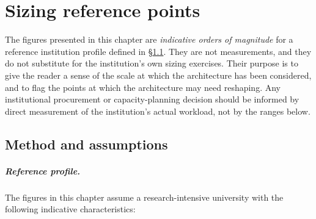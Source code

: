 
\chapter{Sizing reference points}
\label{ch:sizing}

\begin{caveatbox}
\noindent The figures presented in this chapter are \emph{indicative
orders of magnitude} for a reference institution profile defined in
\S\ref{sec:sz-method}. They are not measurements, and they do not
substitute for the institution's own sizing exercises. Their
purpose is to give the reader a sense of the scale at which the
architecture has been considered, and to flag the points at which
the architecture may need reshaping. Any institutional procurement
or capacity-planning decision should be informed by direct
measurement of the institution's actual workload, not by the
ranges below.
\end{caveatbox}

\section{Method and assumptions}
\label{sec:sz-method}

\paragraph{Reference profile.} The figures in this chapter assume a
research-intensive university with the following indicative
characteristics:

